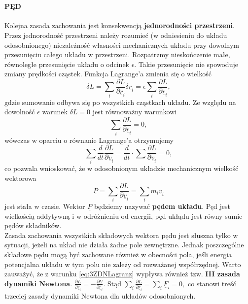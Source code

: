 \documentclass[12pt,a4paper,openright]{report} %
\begin{document}
\\
\\
\textbf{PĘD}\\
\\
Kolejna zasada zachowania jest konsekwencją \textbf{jednorodności przestrzeni}. Przez jednorodność przestrzeni należy rozumieć (w odniesieniu do układu odosobnionego) niezależność własności mechanicznych układu przy dowolnym przesunięciu całego układu w przestrzeni. Rozpatrzmy nieskończenie małe, równoległe przesunięcie układu o odcinek $\epsilon$. Takie przesunięcie nie spowoduje zmiany prędkości cząstek. Funkcja Lagrange'a zmienia się o wielkość 
\begin{equation}
\delta L=\sum \limits_{i} \frac{\partial L}{\partial \underline{r}_i } \delta \underline{r}_i = \epsilon \sum \limits_{i} \frac{\partial L}{\partial \underline{r}_i},
\end{equation}
gdzie sumowanie odbywa się po wszystkich cząstkach układu. Ze względu na dowolność $\epsilon$ warunek $\delta L =0$ jest równoważny warunkowi
\begin{equation}
\sum \limits_{i} \frac{\partial L}{\partial \underline{r}_i}=0,
\label{eq:3ZDNLagranz}
\end{equation}  
wówczas w oparciu o równanie Lagrange'a otrzymujemy
\begin{equation}
\sum \limits_{i} \frac{d}{dt} \frac{\partial L}{\partial \underline{v}_i} = \frac{d}{dt} \cdot \sum \frac{\partial L}{\partial \underline{v}_i}=0,
\end{equation}
co pozwala wnioskować, że w odosobnionym układzie mechanicznym wielkość wektorowa
\begin{equation}
\underline{P}=\sum \limits_{i} \frac{\partial L}{\partial \underline{v}_i} = \sum \limits_{i} m_i \underline{v}_i
\end{equation} 
jest stała w czasie. Wektor $\underline{P}$ będziemy nazywać \textbf{pędem układu}. Pęd jest wielkością addytywną i w odróżnieniu od energii, pęd ukłądu jest równy sumie pędów składników.  
\\
Zasada zachowania wszystkich składowych wektora pędu jest słuszna tylko w sytuacji, jeżeli na układ nie działa żadne pole zewnętrzne. Jednak poszczególne składowe pędu mogą być zachowane również w obecności pola, jeśli energia potencjalna układu w tym polu nie zależy od rozważanej współrzędnej. Warto zauważyć, że z warunku \ref{eq:3ZDNLagranz} wypływa również tzw. \textbf{III zasada dynamiki Newtona}. $\frac{\partial L}{\partial \underline{r}_i}=-\frac{\partial U}{\partial \underline{r}_i}$. Stąd $\sum \limits_{i} \frac{\partial L}{\partial \underline{r}_i}=\sum \limits_{i} \underline{F}_i = 0,$ co stanowi treść trzeciej zasady dynamiki Newtona dla układów odosobnionych.
\end{document}
